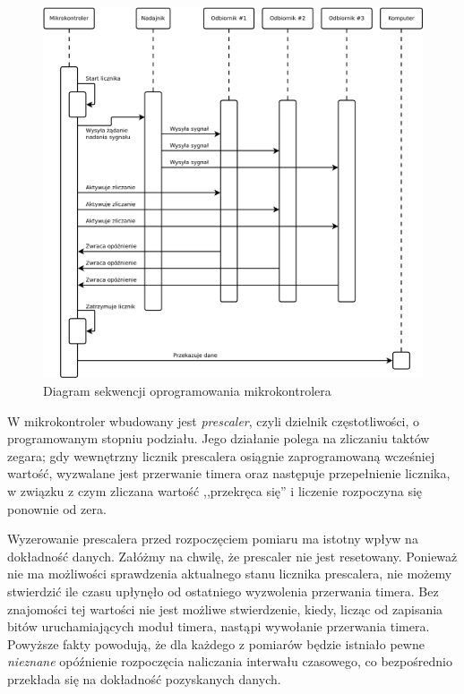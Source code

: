 \begin{figure}
 \hspace{-7em}
 \includegraphics[width=52em]{gfx/diagramy/diagram_sekwencji_sprzetu.pdf}
 \caption{Diagram sekwencji oprogramowania mikrokontrolera}
 \label{fig:firmware_sequence_diagram}
\end{figure}

W mikrokontroler wbudowany jest \textsl{prescaler}, czyli dzielnik częstotliwości, o programowanym stopniu podziału. Jego działanie polega na zliczaniu taktów zegara; gdy wewnętrzny licznik prescalera osiągnie zaprogramowaną wcześniej wartość, wyzwalane jest przerwanie timera oraz następuje przepełnienie licznika, w związku z czym zliczana wartość ,,przekręca się'' i liczenie rozpoczyna się ponownie od zera.
\label{sec:prescaler}

Wyzerowanie prescalera przed rozpoczęciem pomiaru ma istotny wpływ na dokładność danych. Załóżmy na chwilę, że prescaler nie jest resetowany. Ponieważ nie ma możliwości sprawdzenia aktualnego stanu licznika prescalera, nie możemy stwierdzić ile czasu upłynęło od ostatniego wyzwolenia przerwania timera. Bez znajomości tej wartości nie jest możliwe stwierdzenie, kiedy, licząc od zapisania bitów uruchamiających moduł timera, nastąpi wywołanie przerwania timera. Powyższe fakty powodują, że dla każdego z pomiarów będzie istniało pewne \emph{nieznane} opóźnienie rozpoczęcia naliczania interwału czasowego, co bezpośrednio przekłada się na dokładność pozyskanych danych.

